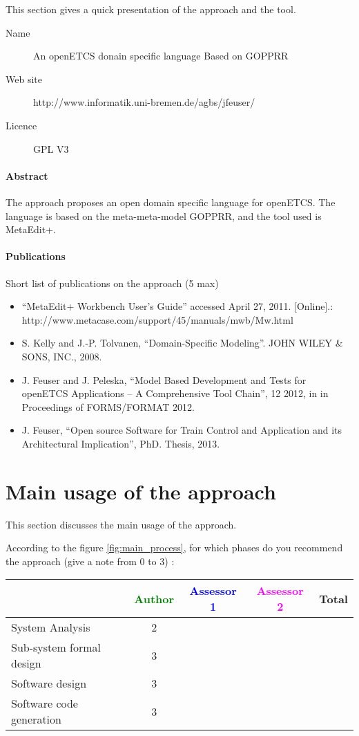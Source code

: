 This section gives a quick presentation of the approach and the tool.

\begin{description}
\item[Name] An openETCS donain specific language Based on GOPPRR
\item[Web site] http://www.informatik.uni-bremen.de/agbs/jfeuser/
\item[Licence] GPL V3
\end{description}

\paragraph{Abstract} 
The approach proposes an open  domain specific language for
openETCS. The language is based on the meta-meta-model  GOPPRR, and the
tool used is MetaEdit+.


\paragraph{Publications} Short list of publications on the approach (5 max)
\begin{itemize}
\item ``MetaEdit+ Workbench User’s Guide'' accessed April 27, 2011. [Online].:
http://www.metacase.com/support/45/manuals/mwb/Mw.html
\item S. Kelly and J.-P. Tolvanen, ``Domain-Specific Modeling''. JOHN WILEY \& SONS, INC.,
2008.
\item J. Feuser and J. Peleska, ``Model Based Development and Tests for openETCS Applications
– A Comprehensive Tool Chain'', 12 2012, in in Proceedings of FORMS/FORMAT 2012.
\item J. Feuser, ``Open source Software for Train Control and
  Application and its Architectural Implication'', PhD. Thesis, 2013.
\end{itemize}


\section{Main usage of the approach}
\label{main_usage}
This section discusses the main usage of the approach.

According to the figure \ref{fig:main_process}, for which phases do you recommend the approach (give a note from 0 to  3) :

\begin{tabular}{|l | c | c | c | c|}
\hline
& \textcolor{green}{Author} & \textcolor{blue}{Assessor 1} & \textcolor{magenta}{Assessor 2} & Total \\
\hline 
System Analysis &
2 & & &  \\
\hline
Sub-system formal design &3 & & & \\
\hline
Software design &3 & & & \\
\hline
Software code generation &3 & & & \\
\hline
\end{tabular}

